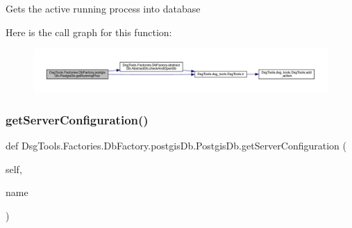 \begin{DoxyVerb}Gets the active running process into database
\end{DoxyVerb}
 Here is the call graph for this function\+:
\nopagebreak
\begin{figure}[H]
\begin{center}
\leavevmode
\includegraphics[width=350pt]{class_dsg_tools_1_1_factories_1_1_db_factory_1_1postgis_db_1_1_postgis_db_add84568ef5bdb462f01ceee72a8c9aed_cgraph}
\end{center}
\end{figure}
\mbox{\label{class_dsg_tools_1_1_factories_1_1_db_factory_1_1postgis_db_1_1_postgis_db_a8860ba56c1bcb5721a2130b1c7530104}} 
\subsubsection{\texorpdfstring{get\+Server\+Configuration()}{getServerConfiguration()}}
{\footnotesize\ttfamily def Dsg\+Tools.\+Factories.\+Db\+Factory.\+postgis\+Db.\+Postgis\+Db.\+get\+Server\+Configuration (\begin{DoxyParamCaption}\item[{}]{self,  }\item[{}]{name }\end{DoxyParamCaption})}

